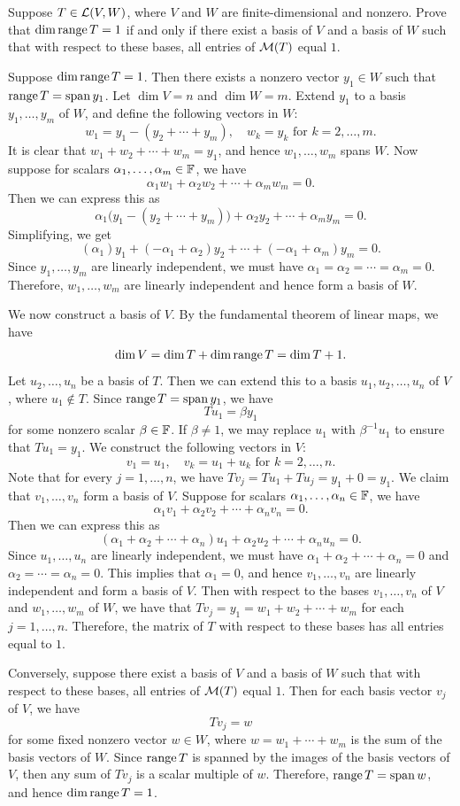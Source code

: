 \begin{exercise}
Suppose $T\in\mathcal{L}(V,W)$, where $V$ and $W$ are finite-dimensional and nonzero.
Prove that $\operatorname{dim}\operatorname{range} T=1$ if and only if there exist a basis of $V$ and a
basis of $W$ such that with respect to these bases, all entries of $\mathcal{M}(T)$
equal $1$.
\end{exercise}
\begin{solution}
Suppose $\operatorname{dim}\operatorname{range} T=1$. Then there exists a nonzero vector $y_1\in W$ such
that $\operatorname{range} T=\operatorname{span} y_1$. Let $\dim V=n$ and $\dim W=m$. Extend $y_1$ to a
basis $y_1,\dots,y_m$ of $W$, and define the following vectors in $W$:
\[ w_1 = y_1-(y_2+\cdots+y_m), \quad w_k = y_k \text{ for } k=2,\dots,m. \]
It is clear that $w_1+w_2+\cdots+w_m=y_1$, and hence $w_1,\dots,w_m$ spans $W$.
Now suppose for scalars $\alpha_1,\dots,\alpha_m\in\mathbb{F}$, we have
\[ \alpha_1w_1+\alpha_2w_2+\cdots+\alpha_mw_m = 0. \]
Then we can express this as
\[ \alpha_1\bigl(y_1-(y_2+\cdots+y_m)\bigr)+\alpha_2y_2+\cdots+\alpha_my_m = 0. \]
Simplifying, we get
\[ (\alpha_1)y_1+(-\alpha_1+\alpha_2)y_2+\cdots+(-\alpha_1+\alpha_m)y_m = 0. \]
Since $y_1,\dots,y_m$ are linearly independent, we must have
$\alpha_1=\alpha_2=\cdots=\alpha_m=0$. Therefore, $w_1,\dots,w_m$ are linearly
independent and hence form a basis of $W$.

We now construct a basis of $V$. By the fundamental theorem of linear maps, we
have
\[ \operatorname{dim} V = \operatorname{dim} T+\operatorname{dim}\operatorname{range} T = \operatorname{dim} T+1. \]
Let $u_2,\dots,u_n$ be a basis of $T$. Then we can extend this to a basis
$u_1,u_2,\dots,u_n$ of $V$, where $u_1\notin T$. Since $\operatorname{range} T=\operatorname{span} y_1$, we
have
\[ Tu_1 = \beta y_1 \]
for some nonzero scalar $\beta\in\mathbb{F}$. If $\beta\ne1$, we may replace $u_1$ with
$\beta^{-1}u_1$ to ensure that $Tu_1=y_1$. We construct the following vectors
in $V$:
\[ v_1 = u_1, \quad v_k = u_1+u_k \text{ for } k=2,\dots,n. \]
Note that for every $j=1,\dots,n$, we have $Tv_j=Tu_1+Tu_j=y_1+0=y_1$. We
claim that $v_1,\dots,v_n$ form a basis of $V$. Suppose for scalars
$\alpha_1,\dots,\alpha_n\in\mathbb{F}$, we have
\[ \alpha_1v_1+\alpha_2v_2+\cdots+\alpha_nv_n = 0. \]
Then we can express this as
\[ (\alpha_1+\alpha_2+\cdots+\alpha_n)u_1+\alpha_2u_2+\cdots+\alpha_nu_n = 0. \]
Since $u_1,\dots,u_n$ are linearly independent, we must have
$\alpha_1+\alpha_2+\cdots+\alpha_n=0$ and $\alpha_2=\cdots=\alpha_n=0$. This
implies that $\alpha_1=0$, and hence $v_1,\dots,v_n$ are linearly independent
and form a basis of $V$. Then with respect to the bases $v_1,\dots,v_n$ of $V$
and $w_1,\dots,w_m$ of $W$, we have that $Tv_j=y_1=w_1+w_2+\cdots+w_m$ for each
$j=1,\dots,n$. Therefore, the matrix of $T$ with respect to these bases has all
entries equal to $1$.

Conversely, suppose there exist a basis of $V$ and a basis of $W$ such that
with respect to these bases, all entries of $\mathcal{M}(T)$ equal $1$. Then for each
basis vector $v_j$ of $V$, we have
\[ Tv_j = w \]
for some fixed nonzero vector $w\in W$, where $w=w_1+\cdots+w_m$ is the sum of
the basis vectors of $W$. Since $\operatorname{range} T$ is spanned by the images of the basis
vectors of $V$, then any sum of $Tv_j$ is a scalar multiple of $w$. Therefore,
$\operatorname{range} T=\operatorname{span} w$, and hence $\operatorname{dim}\operatorname{range} T=1$.
\end{solution}

